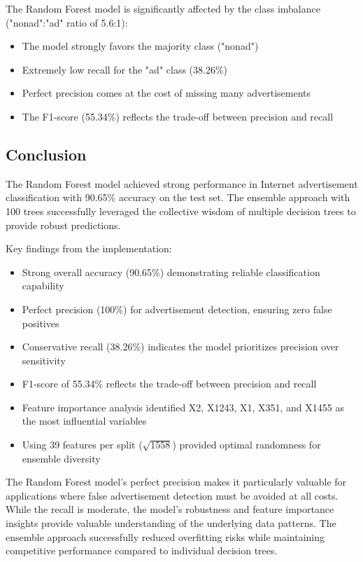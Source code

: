 The Random Forest model is significantly affected by the class imbalance ("nonad":"ad" ratio of 5.6:1):

\begin{itemize}
    \item The model strongly favors the majority class ("nonad")
    \item Extremely low recall for the "ad" class (38.26\%)
    \item Perfect precision comes at the cost of missing many advertisements
    \item The F1-score (55.34\%) reflects the trade-off between precision and recall
\end{itemize}

\subsection{Conclusion}

The Random Forest model achieved strong performance in Internet advertisement classification with 90.65\% accuracy on the test set. The ensemble approach with 100 trees successfully leveraged the collective wisdom of multiple decision trees to provide robust predictions.

Key findings from the implementation:
\begin{itemize}
    \item Strong overall accuracy (90.65\%) demonstrating reliable classification capability
    \item Perfect precision (100\%) for advertisement detection, ensuring zero false positives
    \item Conservative recall (38.26\%) indicates the model prioritizes precision over sensitivity
    \item F1-score of 55.34\% reflects the trade-off between precision and recall
    \item Feature importance analysis identified X2, X1243, X1, X351, and X1455 as the most influential variables
    \item Using 39 features per split ($\sqrt{1558}$) provided optimal randomness for ensemble diversity
\end{itemize}

The Random Forest model's perfect precision makes it particularly valuable for applications where false advertisement detection must be avoided at all costs. While the recall is moderate, the model's robustness and feature importance insights provide valuable understanding of the underlying data patterns. The ensemble approach successfully reduced overfitting risks while maintaining competitive performance compared to individual decision trees.